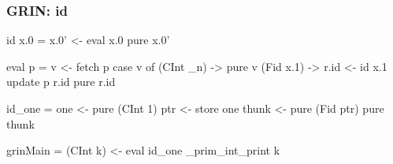 \documentclass[bigger,aspectratio=169]{beamer}
\begin{document}
\begin{frame}[fragile]
\frametitle{GRIN: id}

\begin{center}

	\vspace{0.5cm}
	\begin{minipage}{0.40\textwidth}
		\begin{haskellcode}
			id x.0 =
			 x.0' <- eval x.0
			 pure x.0'
		\end{haskellcode}
		\vfill
		\pause
		\begin{haskellcode}
			eval p =
			 v <- fetch p
			 case v of
			  (CInt _n) -> pure v
			  (Fid x.1) ->
			   r.id <- id x.1
			   update p r.id
			   pure r.id
		\end{haskellcode}
	\end{minipage}
	\hfill
	\pause
	\begin{minipage}{0.50\textwidth}
		\begin{haskellcode}
			id_one =
			 one   <- pure (CInt 1)
			 ptr   <- store one
			 thunk <- pure (Fid ptr)
			 pure thunk
		\end{haskellcode}
		\vspace{1.55cm}
		\pause
		\begin{haskellcode}
			grinMain =
			 (CInt k) <- eval id_one
			 _prim_int_print k
		\end{haskellcode}
	\end{minipage}

\end{center}
\end{frame}
\end{document}
